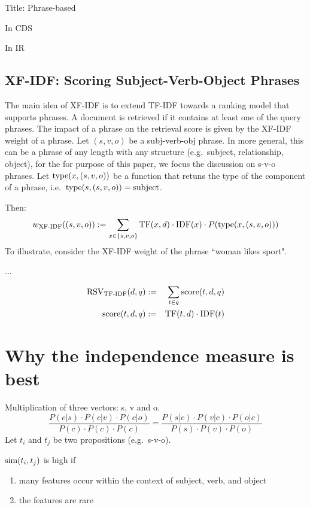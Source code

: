 Title: Phrase-based


In CDS


In IR


\subsection{XF-IDF: Scoring Subject-Verb-Object Phrases}

The main idea of XF-IDF \cite{Azzam/etal:SIGMOD:KEYS:2010} is to extend
TF-IDF towards a ranking model that supports phrases.
%
A document is retrieved if it contains at least one of the query phrases.
%
The impact of a phrase on the retrieval score is given by the XF-IDF
weight of a phrase.
%
Let $(s,v,o)$ be a subj-verb-obj phrase.
In more general, this can be a phrase of any length with any structure
(e.g.~subject, relationship, object), for the for purpose of this paper,
we focus the discussion on s-v-o phrases.
%
Let $\textmd{type}(x,(s,v,o))$ be a function that retuns the type of the component
of a phrase, i.e.~$\textmd{type}(s,(s,v,o))=\textmd{subject}$.

Then:
\[
w_\textmd{XF-IDF}((s,v,o)) :=
\sum_{x \in \{s,v,o\}} \textmd{TF}(x,d) \cdot \textmd{IDF}(x) \cdot P(\textmd{type}(x,(s,v,o)))
\]
To illustrate, consider the XF-IDF weight of the phrase ``woman likes sport".

...

\begin{eqnarray}
\label{tf-idf-phrase}
\textmd{RSV}_\textmd{TF-IDF}(d,q) &:=& \sum_{t \in q} \textmd{score}(t,d,q)\\
\textmd{score}(t,d,q) &:=&
\textmd{TF}(t,d) \cdot \textmd{IDF}(t)
\end{eqnarray}





\section{Why the independence measure is best}

Multiplication of three vectors: s, v and o.
\[
\frac{
P(c|s) \cdot P(c|v) \cdot P(c|o)}{
P(c) \cdot P(c) \cdot P(c)} =
\frac{
P(s|c) \cdot P(v|c) \cdot P(o|c)
}{
P(s) \cdot P(v) \cdot P(o)
}
\]
Let $t_i$ and $t_j$ be two propositions
(e.g.~s-v-o).

$\textmd{sim}(t_i,t_j)$ is high if
\begin{enumerate}
\item many features occur within the context of subject, verb, and object
\item the features are rare
\end{enumerate}


